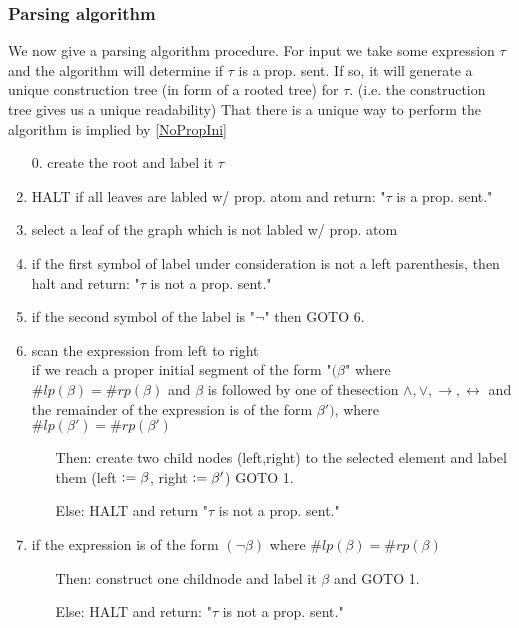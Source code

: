 \subsubsection*{Parsing algorithm}
We now give a parsing algorithm procedure. For input we take some expression $\tau$ and the algorithm will determine if $\tau$ is a prop. sent.
If so, it will generate a unique construction tree (in form of a rooted tree) for $\tau$. (i.e. the construction tree gives us a unique readability)
That there is a unique way to perform the algorithm is implied by \ref{NoPropIni}
\begin{enumerate}
    \item[0.] create the root and label it $\tau$
    \item HALT if all leaves are labled w/ prop. atom and return: "$\tau$ is a prop. sent."
    \item select a leaf of the graph which is not labled w/ prop. atom
    \item if the first symbol of label under consideration is not a left parenthesis, then halt and return: "$\tau$ is not a prop. sent."
    \item if the second symbol of the label is "$\lnot$" then GOTO 6.
    \item scan the expression from left to right\\
    if we reach a proper initial segment of the form "$(\beta$" where $\# lp(\beta) = \#rp(\beta)$ and $\beta$ is followed by one of thesection
    $\land,\lor,\to,\leftrightarrow$ and the remainder of the expression is of the form $\beta')$, where $\# lp(\beta') = \#rp(\beta')$
    \begin{itemize}
        \item [Then:] create two child nodes (left,right) to the selected element and label them (left $\vcentcolon= \beta$, right $\vcentcolon= \beta'$) GOTO 1.
        \item [Else:] HALT and return "$\tau$ is not a prop. sent."
    \end{itemize}
    
    \item if the expression is of the form $(\lnot \beta)$ where $\# lp(\beta) = \#rp(\beta)$
    \begin{itemize}
        \item [Then:] construct one childnode and label it $\beta$ and GOTO 1.
        \item [Else:] HALT and return: "$\tau$ is not a prop. sent."
    \end{itemize}
\end{enumerate}
